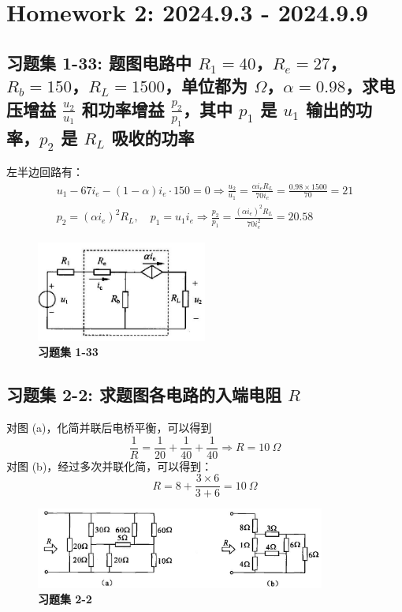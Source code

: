 \documentclass[UTF8]{report}
\theoremstyle{MyLineTheoremStyle} %
\theoremstyle{MyBlockTheoremStyle} %
\theoremstyle{MySubsubsectionStyle} %
\begin{document}
\chapter{Homework 2: 2024.9.3 - 2024.9.9}\thispagestyle{fancy}

\section{习题集 1-33: 题图电路中 $R_1 = 40$，$R_e = 27$，$R_b = 150$，$R_L = 1500$，单位都为 $\Omega$，$\alpha = 0.98$，求电压增益 $\frac{u_2}{u_1}$ 和功率增益 $\frac{p_2}{p_1}$，其中 $p_1$ 是 $u_1$ 输出的功率，$p_2$ 是 $R_L$ 吸收的功率}
左半边回路有：
\begin{gather*}
u_1 - 67i_e - (1-\alpha)i_e \cdot 150 = 0 \Longrightarrow \frac{u_2}{u_1} = \frac{\alpha i_eR_L }{70i_e} = \frac{0.98\times 1500}{70} = 21 \\ 
p_2 = (\alpha i_e)^2R_L, \quad p_1 = u_1 i_e \Longrightarrow \frac{p_2}{p_1} = \frac{(\alpha i_e)^2R_L}{70i_e^2} = 20.58
\end{gather*}

\begin{figure}[H]\centering
\includegraphics[width=0.5\textwidth]{assets/2/image (47).jpg}
\caption{\textbf{习题集 1-33}}
\end{figure}


\section{习题集 2-2: 求题图各电路的入端电阻 $R$}
对图 (a)，化简并联后电桥平衡，可以得到
\begin{equation*}
\frac{1}{R} = \frac{1}{20 } + \frac{1}{40} +\frac{1}{40} \Longrightarrow R = 10\ \Omega
\end{equation*}
对图 (b)，经过多次并联化简，可以得到：
\begin{equation}
R = 8 + \frac{3\times 6}{3+6}=10\ \Omega
\end{equation}
\begin{figure}[H]\centering
\includegraphics[width=0.85\textwidth]{assets/2/e02c39d3f229a4b6352b828e57c3737f.jpg}
\caption{\textbf{习题集 2-2}}
\end{figure}
\end{document}
